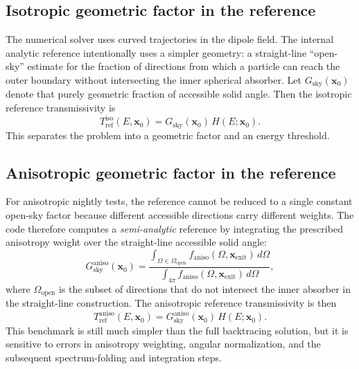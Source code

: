 \documentclass[11pt]{article}
\begin{document}
\subsection{Isotropic geometric factor in the reference}
The numerical solver uses curved trajectories in the dipole field. The internal
analytic reference intentionally uses a simpler geometry: a straight-line
``open-sky'' estimate for the fraction of directions from which a particle can
reach the outer boundary without intersecting the inner spherical absorber. Let
$G_{\mathrm{sky}}(\bm{x}_0)$ denote that purely geometric fraction of accessible
solid angle. Then the isotropic reference transmissivity is
\begin{equation}
  T_{\mathrm{ref}}^{\mathrm{iso}}(E,\bm{x}_0)
  = G_{\mathrm{sky}}(\bm{x}_0)\,H(E;\bm{x}_0).
  \label{eq:Tref_iso}
\end{equation}
This separates the problem into a geometric factor and an energy threshold.

\subsection{Anisotropic geometric factor in the reference}
For anisotropic nightly tests, the reference cannot be reduced to a single
constant open-sky factor because different accessible directions carry different
weights. The code therefore computes a \emph{semi-analytic} reference by
integrating the prescribed anisotropy weight over the straight-line accessible
solid angle:
\begin{equation}
  G_{\mathrm{sky}}^{\mathrm{aniso}}(\bm{x}_0)
  = \frac{\int_{\Omega \in \Omega_{\mathrm{open}}}
     f_{\mathrm{aniso}}(\Omega,\bm{x}_{\mathrm{exit}})\,d\Omega}
    {\int_{4\pi} f_{\mathrm{aniso}}(\Omega,\bm{x}_{\mathrm{exit}})\,d\Omega},
  \label{eq:Gsky_aniso}
\end{equation}
where $\Omega_{\mathrm{open}}$ is the subset of directions that do not intersect
the inner absorber in the straight-line construction. The anisotropic reference
transmissivity is then
\begin{equation}
  T_{\mathrm{ref}}^{\mathrm{aniso}}(E,\bm{x}_0)
  = G_{\mathrm{sky}}^{\mathrm{aniso}}(\bm{x}_0)\,H(E;\bm{x}_0).
  \label{eq:Tref_aniso}
\end{equation}
This benchmark is still much simpler than the full backtracing solution, but it
is sensitive to errors in anisotropy weighting, angular normalization, and the
subsequent spectrum-folding and integration steps.
\end{document}
